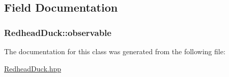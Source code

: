 \subsection{Field Documentation}
\hypertarget{classRedheadDuck_a3d7422c27dbb6def7a7c4b6bcb04d067}{
\subsubsection[{observable}]{ Redhead\-Duck\-::observable\hspace{0.3cm}{\ttfamily [private]}}}\label{classRedheadDuck_a3d7422c27dbb6def7a7c4b6bcb04d067}


The documentation for this class was generated from the following file\-:\begin{DoxyCompactItemize}
\item 
\hyperlink{RedheadDuck_8hpp}{Redhead\-Duck.\-hpp}\end{DoxyCompactItemize}
